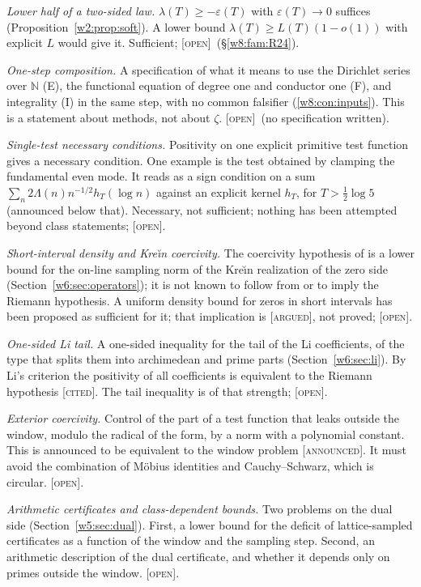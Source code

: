 \documentclass[11pt]{amsart}
\theoremstyle{definition}
\theoremstyle{remark}
\numberwithin{equation}{section}
\newcommand{\N}{\mathbb{N}}
\newcommand{\lam}{\lambda(T)}                          %
\newcommand{\stag}[1]{\textsc{[#1]}}
\newcommand{\CITED}{\stag{cited}}
\newcommand{\ARGUED}{\stag{argued}}
\newcommand{\OPENQ}{\stag{open}}
\newcommand{\ANNOUNCED}{\stag{announced}}
\begin{document}
\emph{Lower half of a two-sided law.} $\lam\ge-\varepsilon(T)$ with $\varepsilon(T)\to0$ suffices
(Proposition~\ref{w2:prop:soft}). A lower bound $\lam\ge L(T)(1-o(1))$ with explicit $L$ would give it. Sufficient;
\OPENQ\ (\S\ref{w8:fam:R24}).

\emph{One-step composition.} A specification of what it means to use the Dirichlet series over $\N$ (E), the
functional equation of degree one and conductor one (F), and integrality (I) in the same step, with no common
falsifier (\ref{w8:con:inputs}). This is a statement about methods, not about $\zeta$. \OPENQ\ (no specification
written).

\emph{Single-test necessary conditions.} Positivity on one explicit primitive test function gives a necessary condition.
One example is the test obtained by clamping the fundamental even mode. It reads as a sign condition on a sum
$\sum_n2\Lambda(n)n^{-1/2}h_T(\log n)$ against an explicit kernel $h_T$, for $T>\frac12\log5$ (announced below that). Necessary, not
sufficient; nothing has been attempted beyond class statements; \OPENQ.

\emph{Short-interval density and Kre\u{\i}n coercivity.} The coercivity hypothesis of \cite{P08} is a lower bound for the
on-line sampling norm of the Kre\u{\i}n realization of the zero side (Section~\ref{w6:sec:operators}); it is not known to follow
from or to imply the Riemann hypothesis. A uniform density bound for zeros in short intervals has been proposed as sufficient
for it; that implication is \ARGUED, not proved; \OPENQ.

\emph{One-sided Li tail.} A one-sided inequality for the tail of the Li coefficients, of the type that splits them into
archimedean and prime parts (Section~\ref{w6:sec:li}). By Li's criterion \cite{Li1997,BombieriLagarias1999} the
positivity of all coefficients is equivalent to the Riemann hypothesis \CITED. The tail inequality is of that strength;
\OPENQ.

\emph{Exterior coercivity.} Control of the part of a test function that leaks outside the window, modulo the radical
of the form, by a norm with a polynomial constant. This is announced to be equivalent to the window problem
\ANNOUNCED. It must avoid the combination of M\"obius identities and Cauchy--Schwarz, which is circular. \OPENQ.

\emph{Arithmetic certificates and class-dependent bounds.} Two problems on the dual side (Section~\ref{w5:sec:dual}).
First, a lower bound for the deficit of lattice-sampled certificates as a function of the window and the sampling
step. Second, an arithmetic description of the dual certificate, and whether it depends only on primes outside the
window. \OPENQ.
\end{document}
